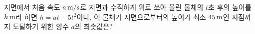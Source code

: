 지면에서 처음 속도 $a\mkern3mu \mathrm{m/s}$로 지면과 수직하게 위로 쏘아 올린 물체의 $t$초 후의 높이를 $h\mkern3mu \mathrm{m}$라 하면 $h=at-5t^2$이다. 이 물체가 지면으로부터의 높이가 최소 $45\mkern3mu \mathrm{m}$인 지점까지 도달하기 위한 양수 $a$의 최솟값은?
